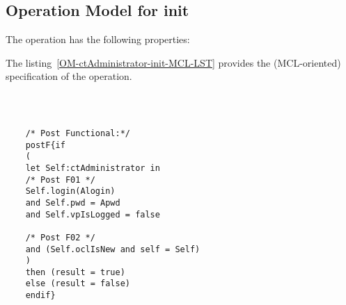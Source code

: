 \subsection{Operation Model for init}

\label{OM-init}


The  operation has the following properties:

	\begin{operationmodel}



		


	\end{operationmodel}



	\vspace{1cm}
	The listing~\ref{OM-ctAdministrator-init-MCL-LST} provides the \msrmessir (MCL-oriented) specification of the operation.
	
	\scriptsize
	\vspace{0.5cm}
	\begin{lstlisting}[style=MessirStyle,firstnumber=auto,captionpos=b,caption={\msrmessir (MCL-oriented) specification of the operation \emph{init}.},label=OM-ctAdministrator-init-MCL-LST]

	
	
	/* Post Functional:*/ 
	postF{if
	(
	let Self:ctAdministrator in
	/* Post F01 */
	Self.login(Alogin)
	and Self.pwd = Apwd
	and Self.vpIsLogged = false
	
	/* Post F02 */
	and (Self.oclIsNew and self = Self)
	)
	then (result = true)
	else (result = false)
	endif}
	
	
	\end{lstlisting}
	\normalsize 
	
